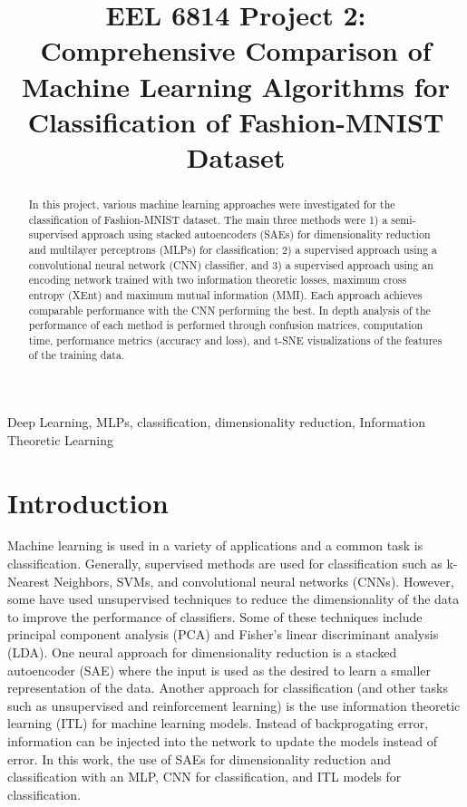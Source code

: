 \documentclass[conference]{IEEEtran}
\begin{document}
\title{EEL 6814 Project 2: Comprehensive Comparison of Machine Learning Algorithms for Classification of Fashion-MNIST Dataset\\}

\author{
}

\maketitle

\begin{abstract}
In this project, various machine learning approaches were investigated for the classification of Fashion-MNIST dataset. The main three methods were 1) a semi-supervised approach using stacked autoencoders (SAEs) for dimensionality reduction and multilayer perceptrons (MLPs) for classification; 2) a supervised approach using a convolutional neural network (CNN) classifier, and 3) a supervised approach using an encoding network trained with two information theoretic losses, maximum cross entropy (XEnt) and maximum mutual information (MMI). Each approach achieves comparable performance with the CNN performing the best. In depth analysis of the performance of each method is performed through confusion matrices, computation time, performance metrics (accuracy and loss), and t-SNE visualizations of the features of the training data. 
\end{abstract}

\begin{IEEEkeywords}
Deep Learning, MLPs, classification, dimensionality reduction, Information Theoretic Learning
\end{IEEEkeywords}

\section{Introduction}
	Machine learning is used in a variety of applications and a common task is classification. Generally, supervised methods are used for classification such as k-Nearest Neighbors, SVMs, and convolutional neural networks (CNNs). However, some have used unsupervised techniques to reduce the dimensionality of the data to improve the performance of classifiers. Some of these techniques include principal component analysis (PCA) and Fisher's linear discriminant analysis (LDA). One neural approach for dimensionality reduction is a stacked autoencoder (SAE) where the input is used as the desired to learn a smaller representation of the data. Another approach for classification (and other tasks such as unsupervised and reinforcement learning) is the use information theoretic learning (ITL) for machine learning models\cite{principe2010information}. Instead of backprogating error, information can be injected into the network to update the models instead of error. In this work, the use of SAEs for dimensionality reduction and classification with an MLP, CNN for classification, and ITL models for classification. 
\end{document}
